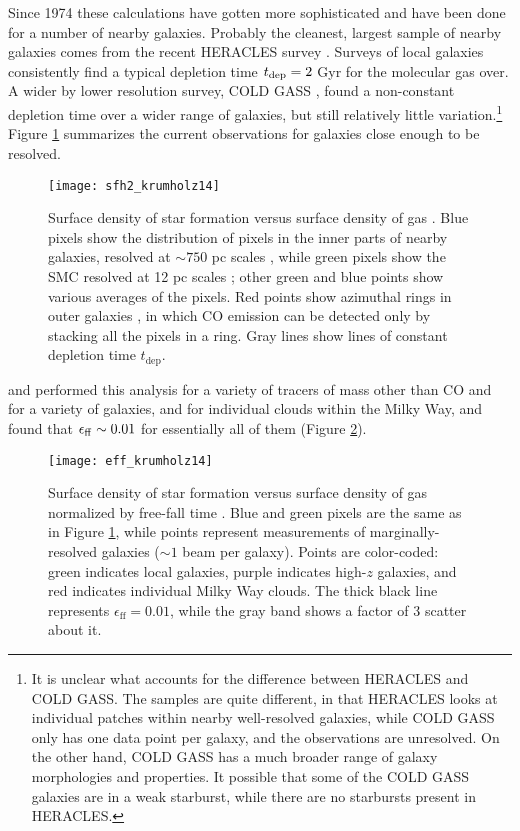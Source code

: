 Since 1974 these calculations have gotten more sophisticated and have been done for a number of nearby galaxies. Probably the cleanest, largest sample of nearby galaxies comes from the recent HERACLES survey \citep{leroy13a}. Surveys of local galaxies consistently find a typical depletion time $t_{\rm dep}=2$ Gyr for the molecular gas over. A wider by lower resolution survey, COLD GASS \citep{saintonge11a, saintonge11b}, found a non-constant depletion time over a wider range of galaxies, but still relatively little variation.\footnote{It is unclear what accounts for the difference between HERACLES and COLD GASS. The samples are quite different, in that HERACLES looks at individual patches within nearby well-resolved galaxies, while COLD GASS only has one data point per galaxy, and the observations are unresolved. On the other hand, COLD GASS has a much broader range of galaxy morphologies and properties. It possible that some of the COLD GASS galaxies are in a weak starburst, while there are no starbursts present in HERACLES.} Figure \ref{fig:sfh2_krumholz14} summarizes the current observations for galaxies close enough to be resolved.


\begin{figure}
\texttt{[image: sfh2\_krumholz14]}
\caption[Surface densities of gas and star formation]{
\label{fig:sfh2_krumholz14}
Surface density of star formation versus surface density of gas \citep{krumholz14c}. Blue pixels show the distribution of pixels in the inner parts of nearby galaxies, resolved at $\sim 750$ pc scales \citet{leroy13a}, while green pixels show the SMC resolved at 12 pc scales \citet{bolatto11a}; other green and blue points show various averages of the pixels. Red points show azimuthal rings in outer galaxies \citet{schruba11a}, in which CO emission can be detected only by stacking all the pixels in a ring. Gray lines show lines of constant depletion time $t_{\mathrm{dep}}$.
}
\end{figure}

\citet{krumholz07e} and \citet{krumholz12a} performed this analysis for a variety of tracers of mass other than CO and for a variety of galaxies, and for individual clouds within the Milky Way, and found that $\epsilon_{\rm ff}\sim 0.01$ for essentially all of them (Figure \ref{fig:eff_krumholz14}).

\begin{figure}
\texttt{[image: eff\_krumholz14]}
\caption[Surface density of star formation versus surface density of gas normalized by free-fall time]{
\label{fig:eff_krumholz14}
Surface density of star formation versus surface density of gas normalized by free-fall time \citep{krumholz14c}. Blue and green pixels are the same as in Figure \ref{fig:sfh2_krumholz14}, while points represent measurements of marginally-resolved galaxies ($\sim 1$ beam per galaxy). Points are color-coded: green indicates local galaxies, purple indicates high-$z$ galaxies, and red indicates individual Milky Way clouds. The thick black line represents $\epsilon_{\mathrm{ff}} = 0.01$, while the gray band shows a factor of 3 scatter about it.
}
\end{figure}

